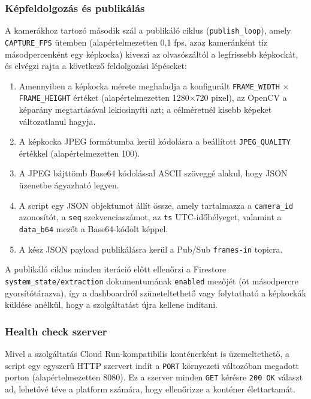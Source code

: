         \subsubsection{Képfeldolgozás és publikálás}
        A kamerákhoz tartozó második szál a publikáló ciklus (\texttt{publish\_loop}), amely \texttt{CAPTURE\_FPS} ütemben
        (alapértelmezetten 0,1 fps, azaz kameránként tíz másodpercenként egy képkocka) kiveszi az olvasószáltól a legfrissebb képkockát,
        és elvégzi rajta a következő feldolgozási lépéseket:
        \begin{enumerate}
            \item Amennyiben a képkocka mérete meghaladja a konfigurált \texttt{FRAME\_WIDTH} × \texttt{FRAME\_HEIGHT} értéket (alapértelmezetten 1280×720 pixel),
                  az OpenCV a képarány megtartásával lekicsinyíti azt; a célméretnél kisebb képeket változatlanul hagyja.
            \item A képkocka JPEG formátumba kerül kódolásra a beállított \texttt{JPEG\_QUALITY} értékkel (alapértelmezetten 100).
            \item A JPEG bájttömb Base64 kódolással ASCII szöveggé alakul, hogy JSON üzenetbe ágyazható legyen.
            \item A script egy JSON objektumot állít össze, amely tartalmazza a \texttt{camera\_id} azonosítót, a \texttt{seq} szekvenciaszámot,
                  az \texttt{ts} UTC-időbélyeget, valamint a \texttt{data\_b64} mezőt a Base64-kódolt képpel.
            \item A kész JSON payload publikálásra kerül a Pub/Sub \texttt{frames-in} topicra.
        \end{enumerate}
        A publikáló ciklus minden iteráció előtt ellenőrzi a Firestore \texttt{system\_state/extraction} dokumentumának \texttt{enabled} mezőjét
        (öt másodpercre gyorsítótárazva), így a dashboardról szüneteltethető vagy folytatható a képkockák küldése anélkül, hogy a szolgáltatást újra kellene indítani.

        \subsubsection{Health check szerver}
        Mivel a szolgáltatás Cloud Run-kompatibilis konténerként is üzemeltethető, a script egy egyszerű HTTP szervert indít a \texttt{PORT}
        környezeti változóban megadott porton (alapértelmezetten 8080). Ez a szerver minden \texttt{GET} kérésre \texttt{200 OK} választ ad,
        lehetővé téve a platform számára, hogy ellenőrizze a konténer élettartamát.

